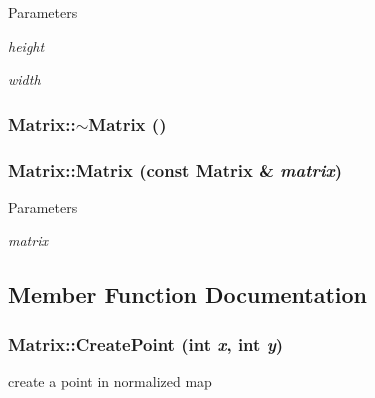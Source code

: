 \begin{DoxyParams}{Parameters}
\item[{\em height}]\item[{\em width}]\end{DoxyParams}
\hypertarget{classMatrix_a9b1c3627f573d78a2f08623fdfef990f}{
\subsubsection[{$\sim$Matrix}]{\setlength{\rightskip}{0pt plus 5cm}Matrix::$\sim$Matrix ()}}
\label{classMatrix_a9b1c3627f573d78a2f08623fdfef990f}
\hypertarget{classMatrix_a2b1fedfb1b076d4ae504d2c61019871f}{
\subsubsection[{Matrix}]{\setlength{\rightskip}{0pt plus 5cm}Matrix::Matrix (const {\bf Matrix} \& {\em matrix})}}
\label{classMatrix_a2b1fedfb1b076d4ae504d2c61019871f}

\begin{DoxyParams}{Parameters}
\item[{\em matrix}]\end{DoxyParams}


\subsection{Member Function Documentation}
\hypertarget{classMatrix_a39929c70aea7926beaf183b374239558}{
\subsubsection[{CreatePoint}]{ Matrix::CreatePoint (int {\em x}, \/  int {\em y})}}
\label{classMatrix_a39929c70aea7926beaf183b374239558}


create a point in normalized map 


